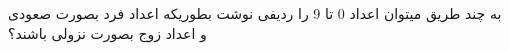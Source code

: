 به چند طریق میتوان اعداد 0 تا 9 را ردیفی نوشت بطوریکه اعداد فرد بصورت صعودی و اعداد زوج بصورت نزولی باشند؟